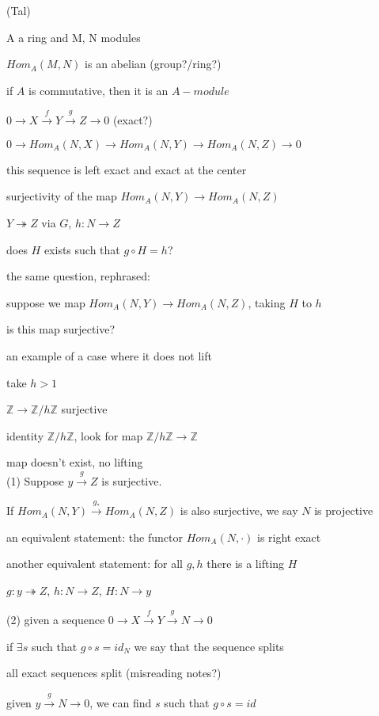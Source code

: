 \documentclass[12pt]{article}
\begin{document}
(Tal)

\noindent
A a ring and M, N modules

$Hom_A(M, N)$ is an abelian (group?/ring?)

if $A$ is commutative, then it is an $A-module$

\noindent
$0 \to X \xrightarrow{f} Y \xrightarrow{g} Z \to 0$ (exact?)

$0 \to Hom_A(N, X) \to Hom_A(N, Y) \to Hom_A(N, Z) \to 0$ 

this sequence is left exact and exact at the center

\noindent
surjectivity of the map $Hom_A(N, Y) \to Hom_A(N, Z)$

$Y \twoheadrightarrow Z$ via $G$, $h: N \to Z$

does $H$ exists such that $g \circ H = h$?

the same question, rephrased:

suppose we map $Hom_A(N, Y) \to Hom_A(N, Z)$, taking $H$ to $h$

is this map surjective?

\noindent
an example of a case where it does not lift

take $h > 1$

$\mathds{Z} \to \mathds{Z}/h\mathds{Z}$ surjective

identity $\mathds{Z}/h\mathds{Z}$, look for map $\mathds{Z}/h\mathds{Z} \to \mathds{Z}$

map doesn't exist, no lifting\\

\noindent
(1) Suppose $y \xrightarrow{g} Z$ is surjective.

If $Hom_A(N, Y) \xrightarrow{g_*} Hom_A(N, Z)$ is also surjective, we say $N$ is projective

an equivalent statement: the functor $Hom_A(N, \cdot)$ is right exact

another equivalent statement: for all $g, h$ there is a lifting $H$

$g: y \twoheadrightarrow Z$, $h: N \to Z$, $H: N \to y$

\noindent
(2) given a sequence $0 \to X \xrightarrow{f} Y \xrightarrow{g} N \to 0$

if $\exists s$ such that $g \circ s = id_N$ we say that the sequence splits

all exact sequences split (misreading notes?)

given $y \xrightarrow{g} N \to 0$, we can find $s$ such that $g \circ s = id$
\end{document}
